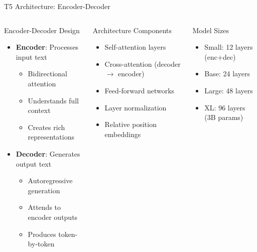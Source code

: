 

\begin{frame}{T5 Architecture: Encoder-Decoder}
\begin{columns}
\begin{block}{Encoder-Decoder Design}
\begin{itemize}
  \item \textbf{Encoder}: Processes input text
  \begin{itemize}
    \item Bidirectional attention
    \item Understands full context
    \item Creates rich representations
  \end{itemize}
  \item \textbf{Decoder}: Generates output text
  \begin{itemize}
    \item Autoregressive generation
    \item Attends to encoder outputs
    \item Produces token-by-token
  \end{itemize}
\end{itemize}
\end{block}
\begin{block}{Architecture Components}
\begin{itemize}
  \item Self-attention layers
  \item Cross-attention (decoder $\rightarrow$ encoder)
  \item Feed-forward networks
  \item Layer normalization
  \item Relative position embeddings
\end{itemize}
\end{block}

\begin{block}{Model Sizes}
\begin{itemize}
  \item Small: 12 layers (enc+dec)
  \item Base: 24 layers
  \item Large: 48 layers
  \item XL: 96 layers (3B params)
\end{itemize}
\end{block}
\end{columns}
\end{frame}


